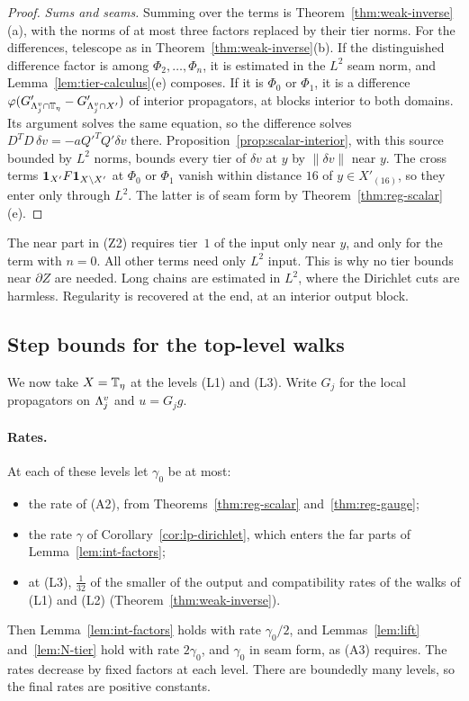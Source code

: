 \begin{proof}
\emph{Sums and seams.} Summing over the terms is Theorem~\ref{thm:weak-inverse}(a), with the norms of at most three factors replaced by their tier norms. For the differences, telescope as in Theorem~\ref{thm:weak-inverse}(b). If the distinguished difference factor is among $\Phi_2,\dots,\Phi_n$, it is estimated in the $L^2$ seam norm, and Lemma~\ref{lem:tier-calculus}(e) composes. If it is $\Phi_0$ or $\Phi_1$, it is a difference $\varphi(G'_{\Lambda^v_{j}\cap\mathbb T_\eta}-G'_{\Lambda^v_{j}\cap X'})$ of interior propagators, at blocks interior to both domains. Its argument solves the same equation, so the difference solves $D^TD\,\delta v=-aQ'^TQ'\delta v$ there. Proposition~\ref{prop:scalar-interior}, with this source bounded by $L^2$ norms, bounds every tier of $\delta v$ at $y$ by $\|\delta v\|$ near $y$. The cross terms $\mathbf 1_{X'}F\mathbf 1_{X\setminus X'}$ at $\Phi_0$ or $\Phi_1$ vanish within distance $16$ of $y\in X'_{(16)}$, so they enter only through $L^2$. The latter is of seam form by Theorem~\ref{thm:reg-scalar}(e).
\end{proof}

\begin{remark}
The near part in (Z2) requires tier~$1$ of the input only near $y$, and only for the term with $n=0$. All other terms need only $L^2$ input. This is why no tier bounds near $\partial Z$ are needed. Long chains are estimated in $L^2$, where the Dirichlet cuts are harmless. Regularity is recovered at the end, at an interior output block.
\end{remark}

\subsection{Step bounds for the top-level walks}

We now take $X=\mathbb T_\eta$ at the levels (L1) and (L3). Write $G_j$ for the local propagators on $\Lambda^v_j$ and $u=G_jg$.

\paragraph{Rates.} At each of these levels let $\gamma_0$ be at most:
\begin{itemize}
\item the rate of (A2), from Theorems~\ref{thm:reg-scalar} and~\ref{thm:reg-gauge};
\item the rate $\gamma$ of Corollary~\ref{cor:lp-dirichlet}, which enters the far parts of Lemma~\ref{lem:int-factors};
\item at (L3), $\frac1{32}$ of the smaller of the output and compatibility rates of the walks of (L1) and (L2) (Theorem~\ref{thm:weak-inverse}).
\end{itemize}
Then Lemma~\ref{lem:int-factors} holds with rate $\gamma_0/2$, and Lemmas~\ref{lem:lift} and~\ref{lem:N-tier} hold with rate $2\gamma_0$, and $\gamma_0$ in seam form, as (A3) requires. The rates decrease by fixed factors at each level. There are boundedly many levels, so the final rates are positive constants.

